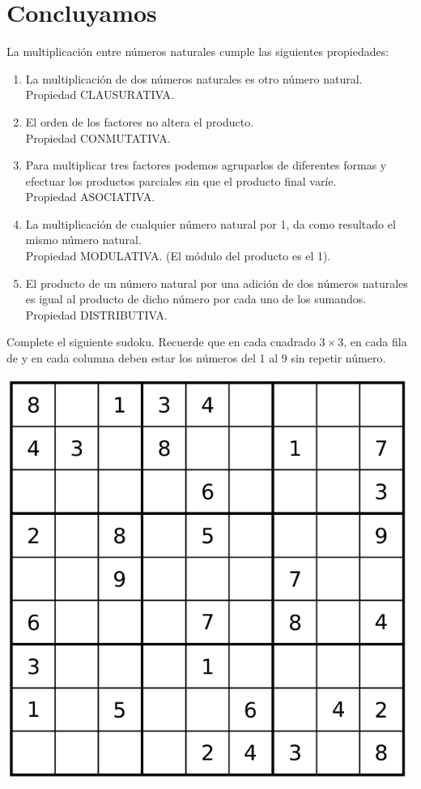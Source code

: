 \documentclass[10pt,twoside]{article}
\begin{document}
\section*{Concluyamos}
La multiplicación entre números naturales cumple las siguientes propiedades:
\begin{enumerate}
\item La multiplicación de dos números naturales es otro número natural.\\
  Propiedad CLAUSURATIVA.
\item El orden de los factores no altera el producto.\\Propiedad CONMUTATIVA.
\item Para multiplicar tres factores podemos agruparlos de diferentes formas y
  efectuar los productos parciales sin que el producto final varíe.\\Propiedad
  ASOCIATIVA.
\item La multiplicación de cualquier número natural por 1, da como resultado el
    mismo número natural.\\Propiedad MODULATIVA. (El módulo del producto
     es el 1).
\item El producto de un número natural por una adición de dos números naturales es igual al producto de dicho número por cada uno de los sumandos.\\Propiedad DISTRIBUTIVA.
\end{enumerate}
Complete el siguiente sudoku. Recuerde que en cada cuadrado $3\times 3$, en cada fila de y en cada columna deben estar los números del 1 al 9 sin repetir n\'{u}mero.
\begin{center}
\includegraphics[scale=.43]{Images/sudoku01.png} 
\end{center}
\end{document}
